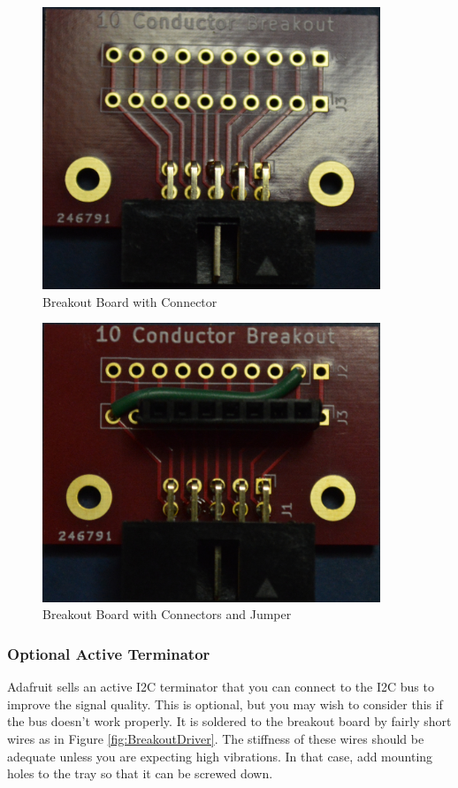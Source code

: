 \documentclass[10pt, openany]{book}
\begin{document}
\begin{figure}[ht!]
  \centering
  \includegraphics[width=0.9\textwidth]{../Pict/Breakout-Connector.jpg}
  \caption{Breakout Board with Connector}
  \label{fig:BreakoutConnector}
\end{figure}

\begin{figure}[ht!]
  \centering
  \includegraphics[width=0.9\textwidth]{../Pict/Breakout-Jumper.jpg}
  \caption{Breakout Board with Connectors and Jumper}
  \label{fig:BreakoutJumper}
\end{figure}

\subsubsection{Optional Active Terminator}
Adafruit sells an active I2C terminator that you can connect to the I2C bus to improve the signal quality.  This is optional, but you may wish to consider this if the bus doesn't work properly.  It is soldered to the breakout board by fairly short wires as in Figure \ref{fig:BreakoutDriver}.  The stiffness of these wires should be adequate unless you are expecting high vibrations.  In that case, add mounting holes to the tray so that it can be screwed down.
\end{document}
